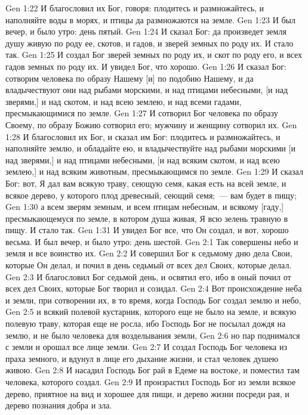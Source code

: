 \vs Gen 1:22 И благословил их Бог, говоря: плодитесь и размножайтесь, и наполняйте воды в морях, и птицы да размножаются на земле.
\vs Gen 1:23 И был вечер, и было утро: день пятый.
\rsbpar\vs Gen 1:24 И сказал Бог: да произведет земля душу живую по роду ее, скотов, и гадов, и зверей земных по роду их. И стало так.
\vs Gen 1:25 И создал Бог зверей земных по роду их, и скот по роду его, и всех гадов земных по роду их. И увидел Бог, что  хорошо.
\rsbpar\vs Gen 1:26 И сказал Бог: сотворим человека по образу Нашему [и] по подобию Нашему, и да владычествуют они над рыбами морскими, и над птицами небесными, [и над зверями,] и над скотом, и над всею землею, и над всеми гадами, пресмыкающимися по земле.
\vs Gen 1:27 И сотворил Бог человека по образу Своему, по образу Божию сотворил его; мужчину и женщину сотворил их.
\vs Gen 1:28 И благословил их Бог, и сказал им Бог: плодитесь и размножайтесь, и наполняйте землю, и обладайте ею, и владычествуйте над рыбами морскими [и над зверями,] и над птицами небесными, [и над всяким скотом, и над всею землею,] и над всяким животным, пресмыкающимся по земле.
\vs Gen 1:29 И сказал Бог: вот, Я дал вам всякую траву, сеющую семя, какая есть на всей земле, и всякое дерево, у которого плод древесный, сеющий семя;~--- вам  будет в пищу;
\vs Gen 1:30 а всем зверям земным, и всем птицам небесным, и всякому [гаду,] пресмыкающемуся по земле, в котором душа живая,  Я всю зелень травную в пищу. И стало так.
\vs Gen 1:31 И увидел Бог все, что Он создал, и вот, хорошо весьма. И был вечер, и было утро: день шестой.
\vs Gen 2:1 Так совершены небо и земля и все воинство их.
\vs Gen 2:2 И совершил Бог к седьмому дню дела Свои, которые Он делал, и почил в день седьмый от всех дел Своих, которые делал.
\vs Gen 2:3 И благословил Бог седьмой день, и освятил его, ибо в оный почил от всех дел Своих, которые Бог творил и созидал.
\rsbpar\vs Gen 2:4 Вот происхождение неба и земли, при сотворении их, в то время, когда Господь Бог создал землю и небо,
\vs Gen 2:5 и всякий полевой кустарник, которого еще не было на земле, и всякую полевую траву, которая еще не росла, ибо Господь Бог не посылал дождя на землю, и не было человека для возделывания земли,
\vs Gen 2:6 но пар поднимался с земли и орошал все лице земли.
\vs Gen 2:7 И создал Господь Бог человека из праха земного, и вдунул в лице его дыхание жизни, и стал человек душею живою.
\vs Gen 2:8 И насадил Господь Бог рай в Едеме на востоке, и поместил там человека, которого создал.
\vs Gen 2:9 И произрастил Господь Бог из земли всякое дерево, приятное на вид и хорошее для пищи, и дерево жизни посреди рая, и дерево познания добра и зла.
